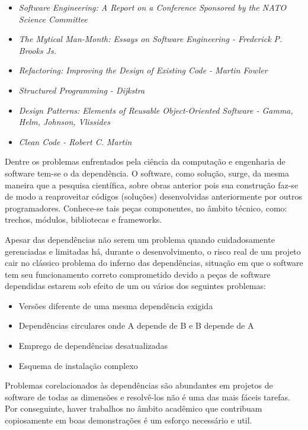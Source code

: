     \begin{itemize}
      \item{ \textit{Software Engineering: A Report on a Conference Sponsored by the NATO Science Committee} }
      \item{ \textit{The Mytical Man-Month: Essays on Software Engineering - Frederick P. Brooks Js. } }
      \item{ \textit{Refactoring: Improving the Design of Existing Code - Martin Fowler} }
      \item{ \textit{Structured Programming - Dijkstra} }
      \item{ \textit{Design Patterns: Elements of Reusable Object-Oriented Software - Gamma, Helm, Johnson, Vlissides} }
      \item{ \textit{Clean Code - Robert C. Martin} }
    \end{itemize}

    Dentre os problemas enfrentados pela ciência da computação e engenharia de software
    tem-se o da dependência. O software, como solução, surge, da mesma maneira
    que a pesquisa científica, sobre obras anterior pois sua construção faz-se de modo
    a reaproveitar códigos (soluções) desenvolvidas anteriormente por outros programadores.
    Conhece-se tais peças componentes, no âmbito técnico, como: trechos, módulos,
    bibliotecas e frameworks. %

    Apesar das dependências não serem um problema quando cuidadosamente gerenciadas
    e limitadas há, durante o desenvolvimento, o risco real de um projeto cair no clássico
    problema do inferno das dependências, situação em que o software tem seu funcionamento
    correto comprometido devido a peças de software dependidas estarem sob efeito de um ou
    vários dos seguintes problemas:

    \begin{itemize}
      \item{Versões diferente de uma mesma dependência exigida}
      \item{Dependências circulares onde A depende de B e B depende de A}
      \item{Emprego de dependências desatualizadas}
      \item{Esquema de instalação complexo}
    \end{itemize}

    Problemas corelacionados às dependências são abundantes em projetos de software de todas
    as dimensões e resolvê-los não é uma das mais fáceis tarefas. Por conseguinte, haver trabalhos
    no âmbito acadêmico que contribuam copiosamente em boas demonstrações é um esforço
    necessário e util.


